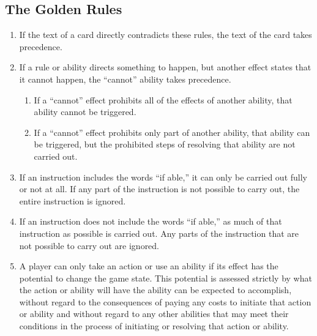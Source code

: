 \subsection{The Golden Rules}
\begin{enumerate}
	\item If the text of a card directly contradicts these rules, the text of the card takes precedence.
	\item If a rule or ability directs something to happen, but another effect states that it cannot happen, the ``cannot'' ability takes precedence.
	      \begin{enumerate}
		      \item If a ``cannot'' effect prohibits all of the effects of another ability, that ability cannot be triggered.
		      \item If a ``cannot'' effect prohibits only part of another ability, that ability can be triggered,	but the prohibited steps of resolving that ability are not carried out.
	      \end{enumerate}
	\item If an instruction includes the words ``if able,'' it can only be carried out fully or not at all. If any part of the instruction is not possible to carry out, the entire instruction is ignored.
	\item If an instruction does not include the words ``if able,'' as much of that instruction as possible is carried out. Any parts of the instruction that are not possible to carry out are ignored.
	\item A player can only take an action or use an ability if its effect has the potential to change the game state. This potential is assessed strictly by what the action or ability will have the ability \textcolor{Bittersweet}{ can be	expected to} accomplish, without regard to the consequences of paying any costs to initiate that action or ability and without regard to any other abilities that may \textcolor{Bittersweet}{ meet their conditions in the process of} initiating or resolving that action or ability.\\[10pt]

\end{enumerate}
